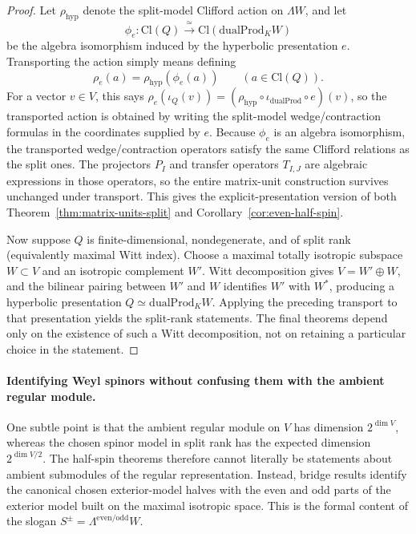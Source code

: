 \documentclass{birkjour}
\theoremstyle{plain}
\theoremstyle{definition}
\theoremstyle{remark}
\newcommand{\Cl}{\mathrm{Cl}}
\newcommand{\dualProd}{\mathrm{dualProd}}
\newcommand{\wedgeW}{\Lambda W}
\begin{document}
\begin{proof}
Let $\rho_{\mathrm{hyp}}$ denote the split-model Clifford action on
$\wedgeW$, and let
\[
  \phi_e:\Cl(Q)\xrightarrow{\ \simeq\ }\Cl(\dualProd_K W)
\]
be the algebra isomorphism induced by the hyperbolic presentation $e$.
Transporting the action simply means defining
\[
  \rho_e(a)=\rho_{\mathrm{hyp}}(\phi_e(a))
  \qquad (a\in \Cl(Q)).
\]
For a vector $v\in V$, this says
\(\rho_e(\iota_Q(v)) = (\rho_{\mathrm{hyp}}\circ \iota_{\dualProd}\circ e)(v)\),
so the transported action is obtained by writing the split-model
wedge/contraction formulas in the coordinates supplied by $e$.
Because $\phi_e$ is an algebra isomorphism, the transported wedge/contraction
operators satisfy the same Clifford relations as the split ones. The
projectors $P_I$ and transfer operators $T_{I,J}$ are algebraic expressions in
those operators, so the entire matrix-unit construction survives unchanged
under transport. This gives the explicit-presentation version of both
Theorem~{}\ref{thm:matrix-units-split} and
Corollary~{}\ref{cor:even-half-spin}.

Now suppose $Q$ is finite-dimensional, nondegenerate, and of split rank
(equivalently maximal Witt index). Choose a maximal totally isotropic subspace $W\subset V$ and an
isotropic complement $W'$. Witt decomposition gives
$V=W'\oplus W$, and the bilinear pairing between $W'$ and $W$ identifies
$W'$ with $W^*$, producing a hyperbolic presentation
$Q\simeq \dualProd_K W$. Applying the preceding transport to that presentation
yields the split-rank statements. The final theorems depend only on the
existence of such a Witt decomposition, not on retaining a particular choice in
the statement.
\end{proof}

\paragraph{Identifying Weyl spinors without confusing them with the ambient
regular module.}
One subtle point is that the ambient regular module on $V$ has dimension
$2^{\dim V}$, whereas the chosen spinor model in split rank has the expected
dimension $2^{\dim V/2}$. The half-spin theorems therefore cannot literally be
statements about ambient submodules of the regular representation. Instead,
bridge results identify the canonical chosen exterior-model halves with the even and odd
parts of the exterior model built on the maximal isotropic space. This is the
formal content of the slogan
$S^{\pm} = \Lambda^{\mathrm{even}/\mathrm{odd}} W$.
\end{document}
